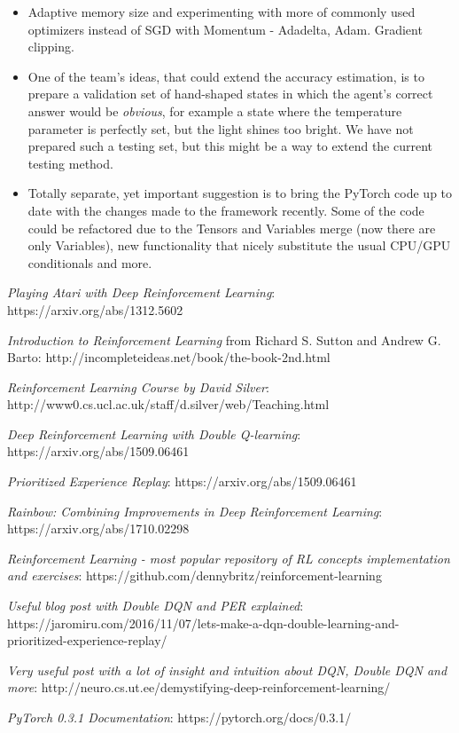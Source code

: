 \documentclass{article}
\begin{document}
\begin{itemize}
\item Adaptive memory size and experimenting with more of commonly used optimizers instead of SGD with Momentum - Adadelta, Adam. Gradient clipping. 

\item One of the team's ideas, that could extend the accuracy estimation, is to prepare a validation set of hand-shaped states in which the agent's correct answer would be \textit{obvious}, for example a state where the temperature parameter is perfectly set, but the light shines too bright. We have not prepared such a testing set, but this might be a way to extend the current testing method.

\item Totally separate, yet important suggestion is to bring the PyTorch code up to date with the changes made to the framework recently. Some of the code could be refactored due to the Tensors and Variables merge (now there are only Variables), new functionality that nicely substitute the usual CPU/GPU conditionals and more. 

\end{itemize}
\newpage

\begin{thebibliography}{99}

  \textit{Playing Atari with Deep Reinforcement Learning}: https://arxiv.org/abs/1312.5602

  
  \textit{Introduction to Reinforcement Learning} from
  Richard S. Sutton and Andrew G. Barto: http://incompleteideas.net/book/the-book-2nd.html

  \textit{Reinforcement Learning Course by David Silver}:
  http://www0.cs.ucl.ac.uk/staff/d.silver/web/Teaching.html 

  \textit{Deep Reinforcement Learning with Double Q-learning}: https://arxiv.org/abs/1509.06461
  
	\textit{Prioritized Experience Replay}: https://arxiv.org/abs/1509.06461
	
  \textit{Rainbow: Combining Improvements in Deep Reinforcement Learning}: https://arxiv.org/abs/1710.02298
	
	\textit{Reinforcement Learning - most popular repository of RL concepts implementation and exercises}: https://github.com/dennybritz/reinforcement-learning

	\textit{Useful blog post with Double DQN and PER explained}: 
	https://jaromiru.com/2016/11/07/lets-make-a-dqn-double-learning-and-prioritized-experience-replay/

	\textit{Very useful post with a lot of insight and intuition about DQN, Double DQN and more}: http://neuro.cs.ut.ee/demystifying-deep-reinforcement-learning/
	
	\textit{PyTorch 0.3.1 Documentation}: https://pytorch.org/docs/0.3.1/

\end{thebibliography}
\end{document}
